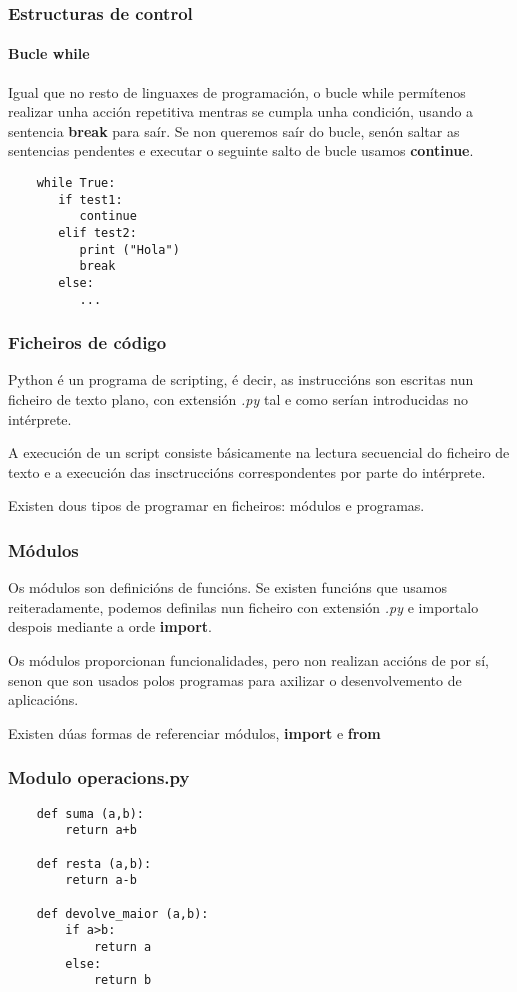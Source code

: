 \begin{frame}[fragile]
  \frametitle{Estructuras de control}
  \framesubtitle{Bucle while}
  Igual que no resto de linguaxes de programación, o bucle while permítenos
  realizar unha acción repetitiva mentras se cumpla unha condición, usando a
  sentencia \textbf{break} para saír. Se non queremos saír do bucle, senón
  saltar as sentencias pendentes e executar o seguinte salto de bucle usamos
  \textbf{continue}.
  \small
\begin{verbatim}
    while True:
       if test1:
          continue
       elif test2:
          print ("Hola")
          break
       else:
          ...    
\end{verbatim}
  \normalsize
\end{frame}

\begin{frame}
  \frametitle{Ficheiros de código}
  Python é un programa de scripting, é decir, as instruccións son escritas nun
  ficheiro de texto plano, con extensión \emph{.py} tal e como serían
  introducidas no intérprete.  

  A execución de un script consiste básicamente na lectura secuencial do
  ficheiro de texto e a execución das insctruccións correspondentes por parte do
  intérprete. 

  Existen dous tipos de programar en ficheiros: módulos e programas.
\end{frame}

\begin{frame}
  \frametitle{Módulos}
  Os módulos son definicións de funcións. Se existen funcións que usamos
  reiteradamente, podemos definilas nun ficheiro con extensión \emph{.py} e
  importalo despois mediante a orde \textbf{import}.

  Os módulos proporcionan funcionalidades, pero non realizan accións de por sí,
  senon que son usados polos programas para axilizar o desenvolvemento de
  aplicacións. 

  Existen dúas formas de referenciar módulos, \textbf{import} e \textbf{from}
\end{frame}

\begin{frame}[fragile]
  \frametitle{Modulo operacions.py}
  \small
  \begin{verbatim}
    def suma (a,b):
        return a+b
    
    def resta (a,b):
        return a-b

    def devolve_maior (a,b):
        if a>b:
            return a
        else:
            return b
  \end{verbatim}
  \normalsize
\end{frame}

